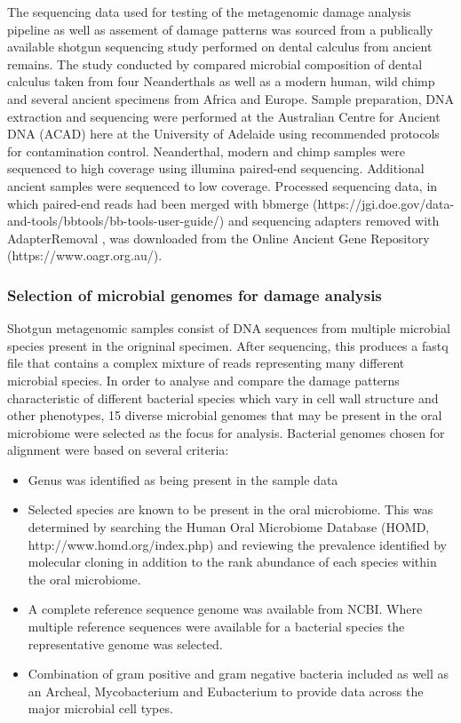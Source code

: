 \documentclass[12pt, a4paper]{article}
\begin{document}
The sequencing data used for testing of the metagenomic damage analysis pipeline as well as assement of damage patterns was sourced from a publically available shotgun sequencing study performed on dental calculus from ancient remains. 
The study conducted by  compared microbial composition of dental calculus taken from four Neanderthals as well as a modern human, wild chimp and several ancient specimens from Africa and Europe. 
Sample preparation, DNA extraction and sequencing were performed at the Australian Centre for Ancient DNA (ACAD) here at the University of Adelaide using recommended protocols for contamination control.
Neanderthal, modern and chimp samples were sequenced to high coverage using illumina paired-end sequencing. 
Additional ancient samples were sequenced to low coverage. 
Processed sequencing data, in which paired-end reads had been merged with bbmerge (https://jgi.doe.gov/data-and-tools/bbtools/bb-tools-user-guide/) and sequencing adapters removed with AdapterRemoval \cite{Schubert:2016aa}, was downloaded from the Online Ancient Gene Repository (https://www.oagr.org.au/). 

\subsubsection{Selection of microbial genomes for damage analysis}

Shotgun metagenomic samples consist of DNA sequences from multiple microbial species present in the origninal specimen. 
After sequencing, this produces a fastq file that contains a complex mixture of reads representing many different microbial species. 
In order to analyse and compare the damage patterns characteristic of different bacterial species which vary in cell wall structure and other phenotypes, 15 diverse microbial genomes that may be present in the oral microbiome were selected as the focus for analysis. 
Bacterial genomes chosen for alignment were based on several criteria:

\begin{itemize}
	\item{Genus was identified as being present in the sample data}
	\item{Selected species are known to be present in the oral microbiome. This was determined by searching the Human Oral Microbiome Database (HOMD, http://www.homd.org/index.php) and reviewing the prevalence identified by molecular cloning in addition to the rank abundance of each species within the oral microbiome.}
		\item{A complete reference sequence genome was available from NCBI. Where multiple reference sequences were available for a bacterial species the representative genome was selected.}
		\item{Combination of gram positive and gram negative bacteria included as well as an Archeal, Mycobacterium and Eubacterium to provide data across the major microbial cell types.}
\end{itemize}
\end{document}
